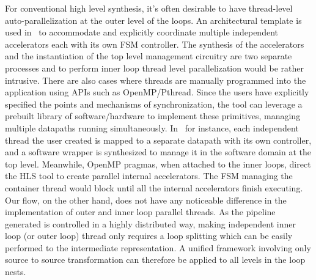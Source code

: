 For conventional high level synthesis, it's often desirable to have thread-level auto-parallelization at the outer level of the loops. An architectural template is used in~\cite{Sheffield:EECS-2013-185} to accommodate and explicitly coordinate multiple independent accelerators
each with its own FSM controller. The synthesis of the accelerators and the instantiation of the top level management circuitry are two separate processes and to perform inner loop thread level parallelization would be rather intrusive. There are also cases where threads are manually programmed into the application  
using APIs such as OpenMP/Pthread. Since the users have explicitly specified the points and mechanisms of synchronization, the tool can 
leverage a prebuilt library of software/hardware to implement these primitives, managing multiple datapaths running simultaneously. In~\cite{legupmultithread} for instance, each independent thread the user created is mapped to a separate datapath with its own controller, and a software wrapper is synthesized to manage it in the software domain at the top level. Meanwhile, OpenMP pragmas, when attached to the inner loops, direct the HLS tool to create parallel internal accelerators.
The FSM managing the container thread would block until all the internal accelerators finish executing.  
Our flow, on the other hand, does not have any noticeable difference in the implementation of outer and inner loop parallel threads. 
As the pipeline generated is controlled in a highly distributed way, making independent inner loop (or outer loop) thread only requires a  loop splitting which can be easily performed to the intermediate representation. A unified framework involving only source to source transformation can therefore be applied to all levels in the loop nests.  

